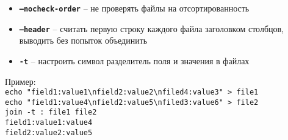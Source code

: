 \documentclass[12pt, a4paper]{article}
\begin{document}
\begin{itemize}
\begin{itemize}
    \item \textbf{\texttt{--nocheck-order}} -- не проверять файлы на
      отсортированность
    \item \textbf{\texttt{--header}} -- считать первую строку каждого файла
      заголовком столбцов, выводить без попыток объединить
    \item \textbf{\texttt{-t}} -- настроить символ разделитель поля и значения
      в файлах
  \end{itemize}
  Пример:\\
  \texttt{echo "field1:value1\backslash nfield2:value2\backslash nfiled4:value3" > file1}\\
  \texttt{echo "field1:value4\backslash nfield2:value5\backslash nfiled3:value6" > file2}\\
  \texttt{join -t : file1 file2}\\
  \texttt{field1:value1:value4}\\
  \texttt{field2:value2:value5}\\
\end{itemize}
\end{document}
